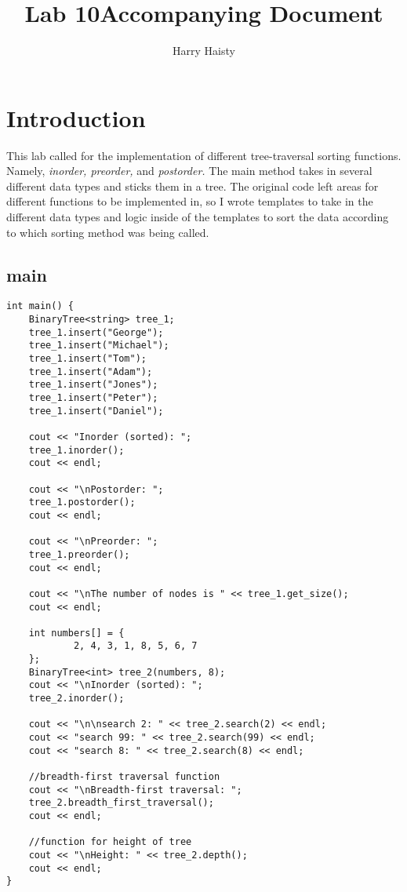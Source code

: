 \documentclass[11pt]{article}
\title{Lab 10Accompanying Document}
\date{}
\author{Harry Haisty}
\begin{document}
\maketitle

\section*{Introduction}
This lab called for the implementation of different tree-traversal sorting functions. Namely, \textit{inorder, preorder,} and \textit{postorder.} The main method takes in several different data types and sticks them in a tree. The original code left areas for different functions to be implemented in, so I wrote templates to take in the different data types and logic inside of the templates to sort the data according to which sorting method was being called. 


\subsection*{main{}}
\begin{lstlisting}
int main() {
    BinaryTree<string> tree_1;
    tree_1.insert("George");
    tree_1.insert("Michael");
    tree_1.insert("Tom");
    tree_1.insert("Adam");
    tree_1.insert("Jones");
    tree_1.insert("Peter");
    tree_1.insert("Daniel");

    cout << "Inorder (sorted): ";
    tree_1.inorder();
    cout << endl;

    cout << "\nPostorder: ";
    tree_1.postorder();
    cout << endl;

    cout << "\nPreorder: ";
    tree_1.preorder();
    cout << endl;

    cout << "\nThe number of nodes is " << tree_1.get_size();
    cout << endl;

    int numbers[] = {
            2, 4, 3, 1, 8, 5, 6, 7
    };
    BinaryTree<int> tree_2(numbers, 8);
    cout << "\nInorder (sorted): ";
    tree_2.inorder();

    cout << "\n\nsearch 2: " << tree_2.search(2) << endl;
    cout << "search 99: " << tree_2.search(99) << endl;
    cout << "search 8: " << tree_2.search(8) << endl;

    //breadth-first traversal function
    cout << "\nBreadth-first traversal: ";
    tree_2.breadth_first_traversal();
    cout << endl;

    //function for height of tree
    cout << "\nHeight: " << tree_2.depth();
    cout << endl;
}
\end{lstlisting}
\end{document}
